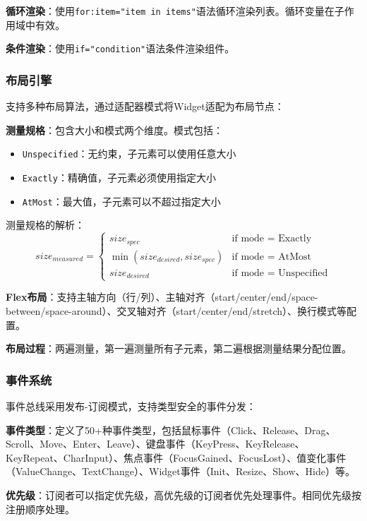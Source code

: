 \textbf{循环渲染}：使用\texttt{for:item="item in items"}语法循环渲染列表。循环变量在子作用域中有效。

\textbf{条件渲染}：使用\texttt{if="condition"}语法条件渲染组件。

\subsubsection{布局引擎}

支持多种布局算法，通过适配器模式将Widget适配为布局节点：

\textbf{测量规格}：包含大小和模式两个维度。模式包括：
\begin{itemize}
    \item \texttt{Unspecified}：无约束，子元素可以使用任意大小
    \item \texttt{Exactly}：精确值，子元素必须使用指定大小
    \item \texttt{AtMost}：最大值，子元素可以不超过指定大小
\end{itemize}

测量规格的解析：
\begin{equation}
size_{measured} = \begin{cases}
size_{spec} & \text{if mode = Exactly} \\
\min(size_{desired}, size_{spec}) & \text{if mode = AtMost} \\
size_{desired} & \text{if mode = Unspecified}
\end{cases}
\end{equation}

\textbf{Flex布局}：支持主轴方向（行/列）、主轴对齐（start/center/end/space-between/space-around）、交叉轴对齐（start/center/end/stretch）、换行模式等配置。

\textbf{布局过程}：两遍测量，第一遍测量所有子元素，第二遍根据测量结果分配位置。

\subsubsection{事件系统}

事件总线采用发布-订阅模式，支持类型安全的事件分发：

\textbf{事件类型}：定义了50+种事件类型，包括鼠标事件（Click、Release、Drag、Scroll、Move、Enter、Leave）、键盘事件（KeyPress、KeyRelease、KeyRepeat、CharInput）、焦点事件（FocusGained、FocusLost）、值变化事件（ValueChange、TextChange）、Widget事件（Init、Resize、Show、Hide）等。

\textbf{优先级}：订阅者可以指定优先级，高优先级的订阅者优先处理事件。相同优先级按注册顺序处理。

